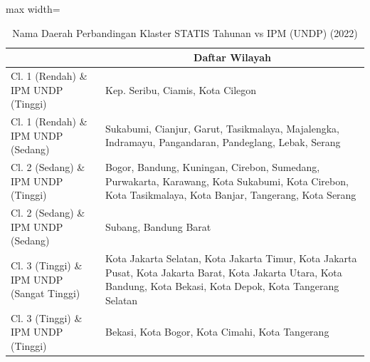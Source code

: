 \begin{table}[H]
\centering
\caption{Nama Daerah Perbandingan Klaster STATIS Tahunan vs IPM (UNDP) (2022)} \label{tab:app2statis_ipm_name_2022}
\begin{adjustbox}{max width=\textwidth}
\begin{tabular}{|>{\centering\arraybackslash}p{4cm}|p{10cm}|}
\hline
\multicolumn{1}{|c|}{\textbf{Kategori}} & \multicolumn{1}{c|}{\textbf{Daftar Wilayah}} \\
\hline
Cl. 1 (Rendah) \& IPM UNDP (Tinggi) & Kep. Seribu, Ciamis, Kota Cilegon \\
\hline
Cl. 1 (Rendah) \& IPM UNDP (Sedang) & Sukabumi, Cianjur, Garut, Tasikmalaya, Majalengka, Indramayu, Pangandaran, Pandeglang, Lebak, Serang \\
\hline
Cl. 2 (Sedang) \& IPM UNDP (Tinggi) & Bogor, Bandung, Kuningan, Cirebon, Sumedang, Purwakarta, Karawang, Kota Sukabumi, Kota Cirebon, Kota Tasikmalaya, Kota Banjar, Tangerang, Kota Serang \\
\hline
Cl. 2 (Sedang) \& IPM UNDP (Sedang) & Subang, Bandung Barat \\
\hline
Cl. 3 (Tinggi) \& IPM UNDP (Sangat Tinggi) & Kota Jakarta Selatan, Kota Jakarta Timur, Kota Jakarta Pusat, Kota Jakarta Barat, Kota Jakarta Utara, Kota Bandung, Kota Bekasi, Kota Depok, Kota Tangerang Selatan \\
\hline
Cl. 3 (Tinggi) \& IPM UNDP (Tinggi) & Bekasi, Kota Bogor, Kota Cimahi, Kota Tangerang \\
\hline
\end{tabular}
\end{adjustbox}
\end{table}